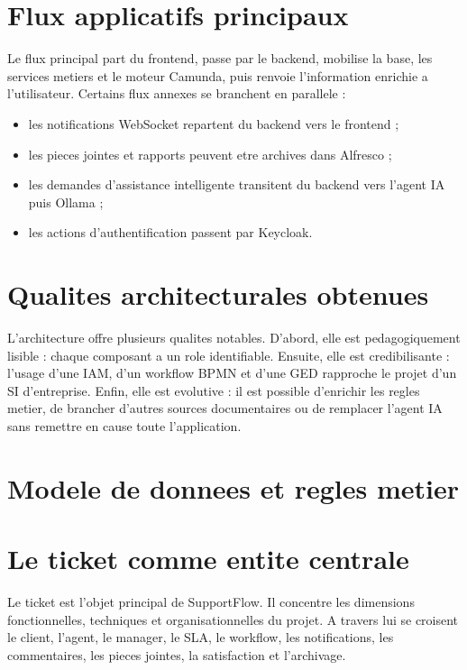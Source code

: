 \section{Flux applicatifs principaux}

Le flux principal part du frontend, passe par le backend, mobilise la base, les services metiers et le moteur Camunda, puis renvoie l'information enrichie a l'utilisateur. Certains flux annexes se branchent en parallele :

\begin{itemize}[leftmargin=1.2cm]
  \item les notifications WebSocket repartent du backend vers le frontend ;
  \item les pieces jointes et rapports peuvent etre archives dans Alfresco ;
  \item les demandes d'assistance intelligente transitent du backend vers l'agent IA puis Ollama ;
  \item les actions d'authentification passent par Keycloak.
\end{itemize}

\section{Qualites architecturales obtenues}

L'architecture offre plusieurs qualites notables. D'abord, elle est pedagogiquement lisible : chaque composant a un role identifiable. Ensuite, elle est credibilisante : l'usage d'une IAM, d'un workflow BPMN et d'une GED rapproche le projet d'un SI d'entreprise. Enfin, elle est evolutive : il est possible d'enrichir les regles metier, de brancher d'autres sources documentaires ou de remplacer l'agent IA sans remettre en cause toute l'application.



\section{Modele de donnees et regles metier}

\section{Le ticket comme entite centrale}

Le ticket est l'objet principal de SupportFlow. Il concentre les dimensions fonctionnelles, techniques et organisationnelles du projet. A travers lui se croisent le client, l'agent, le manager, le SLA, le workflow, les notifications, les commentaires, les pieces jointes, la satisfaction et l'archivage.

